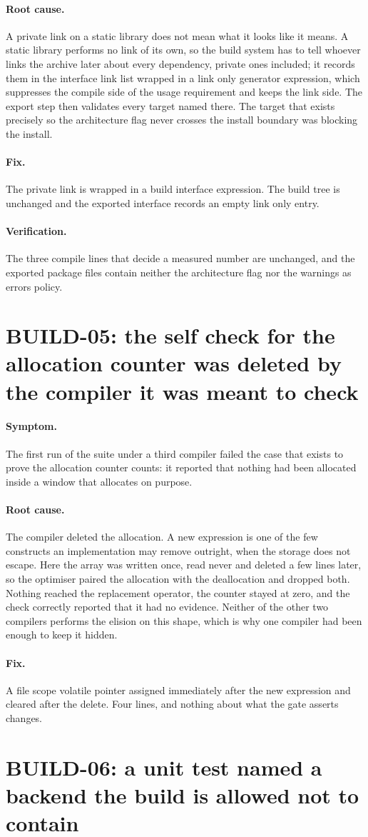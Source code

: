 \documentclass[11pt,a4paper]{report}
\newcommand{\symptom}[1]{\paragraph{Symptom.}#1}
\newcommand{\rootcause}[1]{\paragraph{Root cause.}#1}
\newcommand{\fix}[1]{\paragraph{Fix.}#1}
\newcommand{\verification}[1]{\paragraph{Verification.}#1}
\begin{document}
\rootcause{A private link on a static library does not mean what it looks like it
means. A static library performs no link of its own, so the build system has to
tell whoever links the archive later about every dependency, private ones
included; it records them in the interface link list wrapped in a link only
generator expression, which suppresses the compile side of the usage requirement
and keeps the link side. The export step then validates every target named there.
The target that exists precisely so the architecture flag never crosses the
install boundary was blocking the install.}

\fix{The private link is wrapped in a build interface expression. The build tree
is unchanged and the exported interface records an empty link only entry.}

\verification{The three compile lines that decide a measured number are unchanged,
and the exported package files contain neither the architecture flag nor the
warnings as errors policy.}

\section{BUILD-05: the self check for the allocation counter was deleted by the compiler it was meant to check}

\symptom{The first run of the suite under a third compiler failed the case that
exists to prove the allocation counter counts: it reported that nothing had been
allocated inside a window that allocates on purpose.}

\rootcause{The compiler deleted the allocation. A new expression is one of the
few constructs an implementation may remove outright, when the storage does not
escape. Here the array was written once, read never and deleted a few lines
later, so the optimiser paired the allocation with the deallocation and dropped
both. Nothing reached the replacement operator, the counter stayed at zero, and
the check correctly reported that it had no evidence. Neither of the other two
compilers performs the elision on this shape, which is why one compiler had been
enough to keep it hidden.}

\fix{A file scope volatile pointer assigned immediately after the new expression
and cleared after the delete. Four lines, and nothing about what the gate asserts
changes.}

\section{BUILD-06: a unit test named a backend the build is allowed not to contain}
\end{document}
